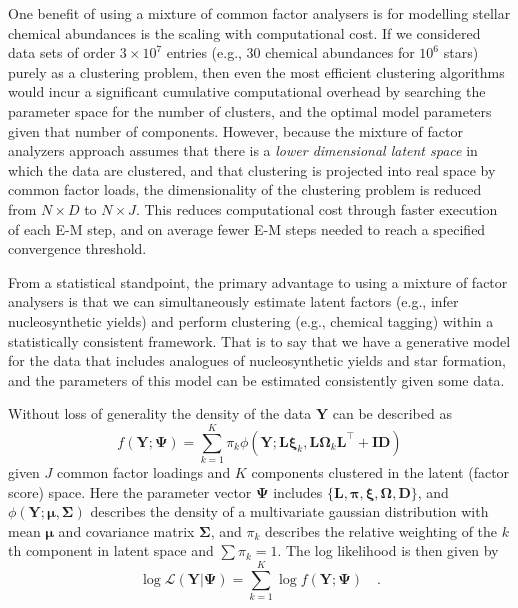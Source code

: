 \documentclass[twocolumn]{aastex61}
\newcommand{\vect}[1]{\boldsymbol{\mathbf{#1}}}
\renewcommand{\vec}[1]{\vect{#1}}
\newcommand{\weight}{\pi}
\newcommand{\data}{\textbf{Y}}
\newcommand{\vecdata}{\vec\data}
\newcommand{\transpose}{^\intercal}
\newcommand{\eye}{\textbf{I}}
\newcommand{\factorloads}{\textbf{L}}
\newcommand{\specificvariance}{\vec{D}}
\newcommand{\scoremeans}{\vec\xi}
\newcommand{\scorecovs}{\vec\Omega}
\newcommand{\NumLatentFactors}{J}
\newcommand{\NumComponents}{K}
\newcommand{\numcomponents}{k}
\begin{document}
One benefit of using a mixture of common factor analysers is
for modelling stellar chemical abundances is the scaling with
computational cost. If we considered data sets of order $3\times10^7$
entries (e.g., 30 chemical abundances for $10^6$ stars) purely as a
clustering problem, then even the most efficient clustering
algorithms would incur a significant cumulative computational 
overhead by searching the parameter space for the number of
clusters, and the optimal model parameters given that number
of components. However, because the mixture of factor analyzers
approach assumes that there is a \emph{lower dimensional latent 
space} in which the data are clustered, and that clustering is 
projected into real space by common factor loads, the 
dimensionality of the clustering problem is reduced from 
$N \times D$ to $N \times J$. This reduces computational cost through
faster execution of each E-M step, and on average fewer E-M steps
needed to reach a specified convergence threshold.

From a statistical standpoint, the primary advantage to using
a mixture of factor analysers is that we can simultaneously
estimate latent factors (e.g., infer nucleosynthetic 
yields) and perform clustering (e.g., chemical tagging) 
within a statistically consistent framework. That is to say
that we have a generative model for the data that includes
analogues of nucleosynthetic yields and star formation,
and the parameters of this model can be estimated consistently
given some data.

Without loss of generality the density of the data $\vecdata$ can be described as
\begin{equation}
	f(\vecdata; \vec\Psi) = \sum_{\numcomponents=1}^{\NumComponents}\weight_\numcomponents\phi(\vecdata;\factorloads\scoremeans_\numcomponents, \factorloads\scorecovs_\numcomponents\factorloads\transpose + \eye\specificvariance)
\end{equation}
\noindent{}given $\NumLatentFactors$ common factor loadings and $\NumComponents$ components
clustered in the latent (factor score) space. Here the parameter
vector
$\vec\Psi$ includes $\{\factorloads,\vec\pi,\scoremeans,\scorecovs,\specificvariance\}$, and $\phi(\vecdata;\vec\mu, \vec\Sigma)$
describes the density of a multivariate gaussian distribution with
mean $\vec\mu$ and covariance matrix $\vec\Sigma$,
and $\weight_\numcomponents$ describes the relative weighting of the $\numcomponents$th
component in latent space and $\sum\weight_\numcomponents = 1$.
The log likelihood is then given by
\begin{equation}
	\log\mathcal{L}(\vecdata|\vec\Psi) = \sum_{\numcomponents=1}^{\NumComponents}\log{f(\vecdata;\vec\Psi)} \quad .
\end{equation}
\end{document}
